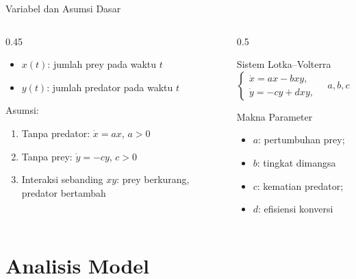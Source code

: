 \documentclass[aspectratio=32]{beamer}
\begin{document}
\begin{frame}{Variabel dan Asumsi Dasar}
  \begin{columns}[t]
  \begin{column}{0.45\textwidth}
    \begin{itemize}
      \item \(x(t)\): jumlah prey pada waktu \(t\)
      \item \(y(t)\): jumlah predator pada waktu \(t\)
    \end{itemize}
    \vspace{0.5em}
    Asumsi:
    \begin{enumerate}
      \item Tanpa predator: \(\dot{x}=ax\), \(a>0\)
      \item Tanpa prey: \(\dot{y}=-cy\), \(c>0\)
      \item Interaksi sebanding \(xy\): prey berkurang, predator bertambah
    \end{enumerate}
  \end{column}
  \begin{column}{0.5\textwidth}
    \begin{block}{Sistem Lotka–Volterra}
      \[
      \begin{cases}
      \dot{x} = ax - bxy,\\
      \dot{y} = -cy + dxy,
      \end{cases}\quad a,b,c,d>0.
      \]
    \end{block}
    \begin{block}{Makna Parameter}
    	\begin{itemize}
    		\item \(a\): pertumbuhan prey;
    		\item \(b\): tingkat dimangsa
    		\item \(c\): kematian predator;
    		\item \(d\): efisiensi konversi
    	\end{itemize}
      
    \end{block}
  \end{column}
  \end{columns}
\end{frame}

\section{Analisis Model}
\end{document}
